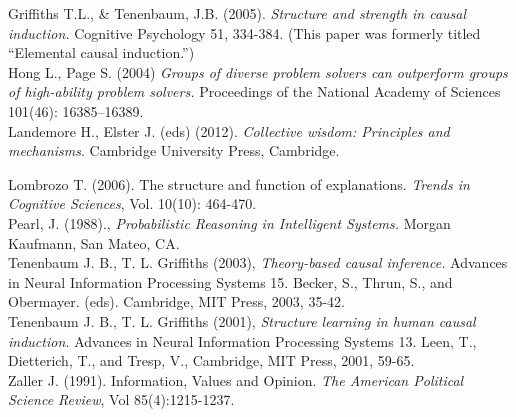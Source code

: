 \documentclass[11pt]{article}
\begin{document}
Griffiths T.L., \& Tenenbaum, J.B. (2005). \textit{Structure and strength in causal induction.} Cognitive Psychology 51, 334-384. (This paper was formerly titled ``Elemental causal induction.'')
\\


Hong L., Page S. (2004) \textit{Groups of diverse problem solvers can outperform groups of high-ability problem solvers.} Proceedings of the National Academy of Sciences 101(46): 16385–16389.
\\
Landemore H., Elster J. (eds) (2012). \textit{Collective wisdom: Principles and mechanisms}. Cambridge University Press, Cambridge.

Lombrozo T. (2006). The structure and function of explanations. \textit{Trends in Cognitive Sciences}, Vol. 10(10): 464-470.
\\

Pearl, J. (1988)., \textit{Probabilistic Reasoning in Intelligent Systems.} Morgan Kaufmann, San Mateo, CA.
\\

Tenenbaum J. B., T. L. Griffiths (2003), \textit{Theory-based causal inference.} Advances in Neural Information Processing Systems 15. Becker, S., Thrun, S., and Obermayer. (eds). Cambridge, MIT Press, 2003, 35-42.
\\

Tenenbaum J. B., T. L. Griffiths (2001), \textit{Structure learning in human causal induction.} Advances in Neural Information Processing Systems 13. Leen, T., Dietterich, T., and Tresp, V., Cambridge, MIT Press, 2001, 59-65.
\\


Zaller J. (1991). Information, Values and Opinion. \textit{The American Political Science Review}, Vol 85(4):1215-1237.
\end{document}
